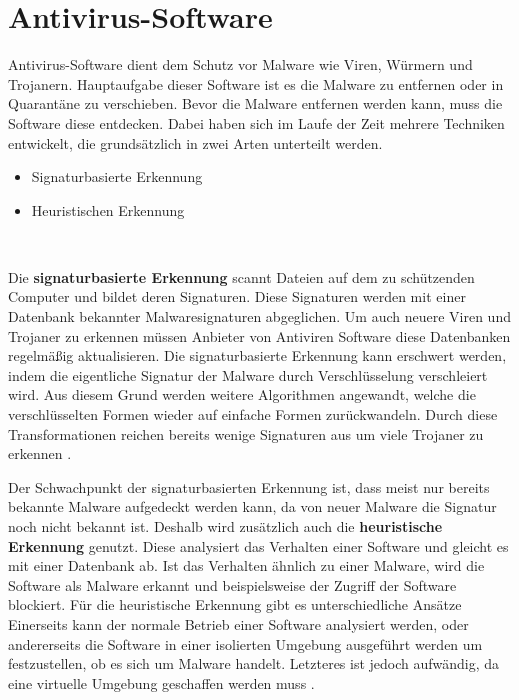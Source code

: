 \section{Antivirus-Software}\label{sec:antivirus}
Antivirus-Software dient dem Schutz vor Malware wie Viren, Würmern und Trojanern.
Hauptaufgabe dieser Software ist es die Malware zu entfernen oder in Quarantäne zu verschieben.
Bevor die Malware entfernen werden kann, muss die Software diese entdecken.
Dabei haben sich im Laufe der Zeit mehrere Techniken entwickelt, die grundsätzlich 
in zwei Arten unterteilt werden.\cite{ANTNE1}
\begin{itemize}
    \item Signaturbasierte Erkennung
    \item Heuristischen Erkennung
\end{itemize}
\ 

Die \textbf{signaturbasierte Erkennung} scannt Dateien auf dem zu schützenden Computer 
und bildet deren Signaturen. 
Diese Signaturen werden mit einer Datenbank bekannter Malwaresignaturen abgeglichen.
Um auch neuere Viren und Trojaner zu erkennen müssen Anbieter von Antiviren Software diese Datenbanken regelmäßig aktualisieren.
Die signaturbasierte Erkennung kann erschwert werden, indem die eigentliche Signatur der Malware durch Verschlüsselung verschleiert wird.
Aus diesem Grund werden weitere Algorithmen angewandt, welche die verschlüsselten Formen wieder auf einfache Formen zurückwandeln.
Durch diese Transformationen reichen bereits wenige Signaturen aus um
viele Trojaner zu erkennen \cite{ANTNE2}.

Der Schwachpunkt der signaturbasierten Erkennung ist, dass meist nur bereits bekannte Malware aufgedeckt werden kann,
da von neuer Malware die Signatur noch nicht bekannt ist.
Deshalb wird zusätzlich auch die \textbf{heuristische Erkennung} genutzt. 
Diese analysiert das Verhalten einer Software und gleicht es mit einer Datenbank ab.
Ist das Verhalten ähnlich zu einer Malware, wird die Software als Malware erkannt und beispielsweise der Zugriff der Software blockiert.
Für die heuristische Erkennung gibt es unterschiedliche Ansätze
Einerseits kann der normale Betrieb einer Software analysiert werden,
oder andererseits die Software in einer isolierten Umgebung ausgeführt werden um festzustellen,
ob es sich um Malware handelt. 
Letzteres ist jedoch aufwändig, da eine virtuelle Umgebung geschaffen werden muss \cite{ANTNE3}.

